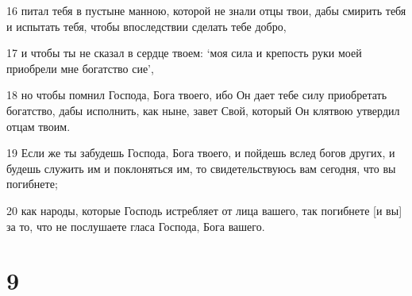 \par 16 питал тебя в пустыне манною, которой не знали отцы твои, дабы смирить тебя и испытать тебя, чтобы впоследствии сделать тебе добро,
\par 17 и чтобы ты не сказал в сердце твоем: `моя сила и крепость руки моей приобрели мне богатство сие',
\par 18 но чтобы помнил Господа, Бога твоего, ибо Он дает тебе силу приобретать богатство, дабы исполнить, как ныне, завет Свой, который Он клятвою утвердил отцам твоим.
\par 19 Если же ты забудешь Господа, Бога твоего, и пойдешь вслед богов других, и будешь служить им и поклоняться им, то свидетельствуюсь вам сегодня, что вы погибнете;
\par 20 как народы, которые Господь истребляет от лица вашего, так погибнете [и вы] за то, что не послушаете гласа Господа, Бога вашего.

\chapter{9}

